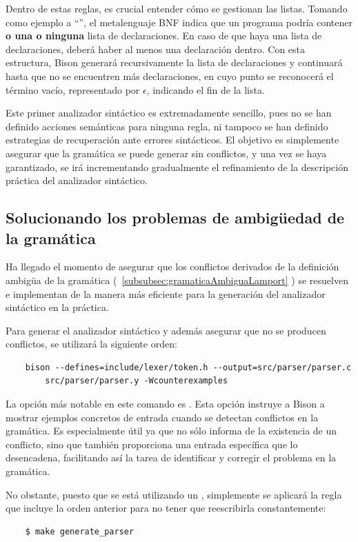 Dentro de estas reglas, es crucial entender cómo se gestionan las listas. Tomando como ejemplo a ``'', el metalenguaje BNF indica que un programa podría contener \textbf{o una o ninguna} lista de declaraciones. En caso de que haya una lista de declaraciones, deberá haber al menos una declaración dentro. Con esta estructura, Bison generará recursivamente la lista de declaraciones y continuará hasta que no se encuentren más declaraciones, en cuyo punto se reconocerá el término vacío, representado por $\epsilon$, indicando el fin de la lista.



Este primer analizador sintáctico es extremadamente sencillo, pues no se han definido acciones semánticas para ninguna regla, ni tampoco se han definido estrategias de recuperación ante errores sintácticos. El objetivo es simplemente asegurar que la gramática se puede generar sin conflictos, y una vez se haya garantizado, se irá incrementando gradualmente el refinamiento de la descripción práctica del analizador sintáctico.

\subsection{Solucionando los problemas de ambigüedad de la gramática}
Ha llegado el momento de asegurar que los conflictos derivados de la definición ambigüa de la gramática (~\ref{subsubsec:gramaticaAmbiguaLamport} ) se resuelven e implementan de la manera más eficiente para la generación del analizador sintáctico en la práctica.


\noindent
Para generar el analizador sintáctico y además asegurar que no se producen conflictos, se utilizará la siguiente orden:
\begin{verbatim}
    bison --defines=include/lexer/token.h --output=src/parser/parser.c 
        src/parser/parser.y -Wcounterexamples
\end{verbatim}

La opción más notable en este comando es . Esta opción instruye a Bison a mostrar ejemplos concretos de entrada cuando se detectan conflictos en la gramática. Es especialmente útil ya que no sólo informa de la existencia de un conflicto, sino que también proporciona una entrada específica que lo desencadena, facilitando así la tarea de identificar y corregir el problema en la gramática.



No obstante, puesto que se está utilizando un , simplemente se aplicará la regla que incluye la orden anterior para no tener que reescribirla constantemente:
\begin{verbatim}
    $ make generate_parser
\end{verbatim}

